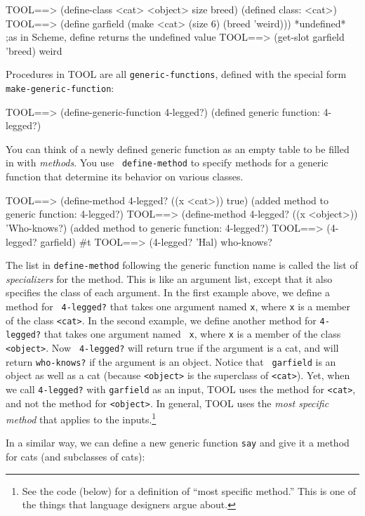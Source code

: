 \beginlisp
TOOL==> (define-class <cat> <object> size breed)
(defined class: <cat>)
\null
TOOL==> (define garfield (make <cat> (size 6) (breed 'weird)))
*undefined*     ;as in Scheme, define returns the undefined value
\null
TOOL==> (get-slot garfield 'breed)
weird
\endlisp

Procedures in TOOL are all {\tt generic-functions}, defined with the
special form {\tt make-generic-function}:

\beginlisp
TOOL==> (define-generic-function 4-legged?)
(defined generic function: 4-legged?)
\endlisp

\noindent You can think of a newly defined generic function as an
empty table to be filled in with {\it methods}.  You use {\tt
define-method} to specify methods for a generic function that
determine its behavior on various classes.

\beginlisp
TOOL==> (define-method 4-legged? ((x <cat>))
           true)
(added method to generic function: 4-legged?)
\null
TOOL==> (define-method 4-legged? ((x <object>))
           'Who-knows?)
(added method to generic function: 4-legged?)
\null
TOOL==> (4-legged? garfield)
\#t
TOOL==> (4-legged? 'Hal)
who-knows?
\endlisp

\noindent
The list in {\tt define-method} following the generic function name is
called the list of {\it specializers} for the method.  This is like an
argument list, except that it also specifies the class of each
argument.  In the first example above, we define a method for {\tt
4-legged?} that takes one argument named {\tt x}, where {\tt x} is a
member of the class {\tt <cat>}.  In the second example, we define
another method for {\tt 4-legged?} that takes one argument named {\tt
x}, where {\tt x} is a member of the class {\tt <object>}.  Now {\tt
4-legged?} will return true if the argument is a cat, and will return
{\tt who-knows?} if the argument is an object.  Notice that {\tt
garfield} is an object as well as a cat (because {\tt <object>} is the
superclass of {\tt <cat>}).  Yet, when we call {\tt 4-legged?} with
{\tt garfield} as an input, TOOL uses the method for {\tt <cat>}, and
not the method for {\tt <object>}.  In general, TOOL uses the {\it
most specific method} that applies to the inputs.\footnote{See the
code (below) for a definition of ``most specific method.''  This is
one of the things that language designers argue about.}

In a similar way, we can define a new generic function {\tt say} and
give it a method for cats (and subclasses of cats):

